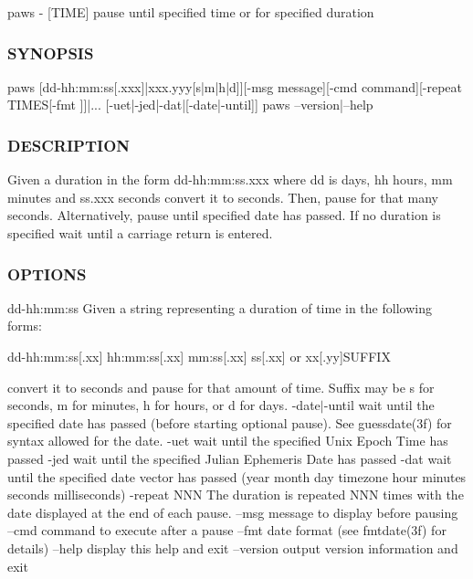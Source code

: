 paws -\/ \mbox{[}T\+I\+ME\mbox{]} pause until specified time or for specified duration 

\subsubsection*{S\+Y\+N\+O\+P\+S\+IS}

\begin{DoxyVerb}paws [dd-hh:mm:ss[.xxx]|xxx.yyy[s|m|h|d]][-msg message][-cmd command][-repeat TIMES[-fmt ]]|...
[-uet|-jed|-dat|[-date|-until]]
paws --version|--help
\end{DoxyVerb}


\subsubsection*{D\+E\+S\+C\+R\+I\+P\+T\+I\+ON}

Given a duration in the form dd-\/hh\+:mm\+:ss.\+xxx where dd is days, hh hours, mm minutes and ss.\+xxx seconds convert it to seconds. Then, pause for that many seconds. Alternatively, pause until specified date has passed. If no duration is specified wait until a carriage return is entered.

\subsubsection*{O\+P\+T\+I\+O\+NS}

dd-\/hh\+:mm\+:ss Given a string representing a duration of time in the following forms\+:

dd-\/hh\+:mm\+:ss\mbox{[}.xx\mbox{]} hh\+:mm\+:ss\mbox{[}.xx\mbox{]} mm\+:ss\mbox{[}.xx\mbox{]} ss\mbox{[}.xx\mbox{]} or xx\mbox{[}.yy\mbox{]}S\+U\+F\+F\+IX

convert it to seconds and pause for that amount of time. Suffix may be s for seconds, m for minutes, h for hours, or d for days. -\/date$\vert$-\/until wait until the specified date has passed (before starting optional pause). See guessdate(3f) for syntax allowed for the date. -\/uet wait until the specified Unix Epoch Time has passed -\/jed wait until the specified Julian Ephemeris Date has passed -\/dat wait until the specified date vector has passed (year month day timezone hour minutes seconds milliseconds) -\/repeat N\+NN The duration is repeated N\+NN times with the date displayed at the end of each pause. --msg message to display before pausing --cmd command to execute after a pause --fmt date format (see fmtdate(3f) for details) --help display this help and exit --version output version information and exit

